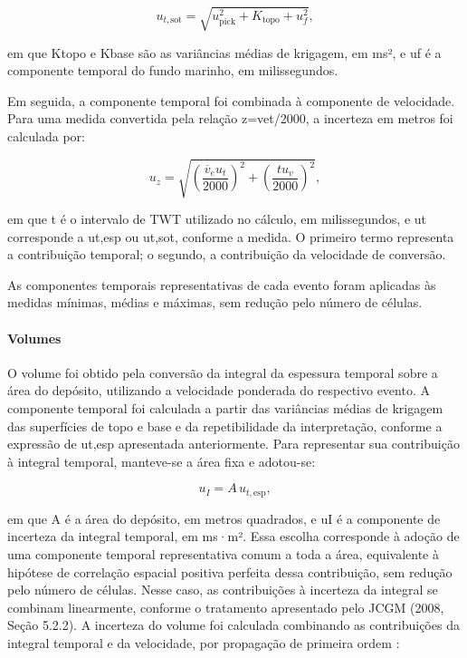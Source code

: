 \begin{equation}
  u_{t,\mathrm{sot}}=\sqrt{u_{\mathrm{pick}}^2+K_{\mathrm{topo}}+u_f^2},
  \label{eq:incerteza-temporal-soterramento}
\end{equation}

\noindent
em que Ktopo e Kbase são as variâncias médias de krigagem, em ms², e uf é a componente temporal do fundo marinho, em milissegundos.

Em seguida, a componente temporal foi combinada à componente de velocidade. Para uma medida convertida pela relação z=vet/2000, a incerteza em metros foi calculada por:

\begin{equation}
  u_z=\sqrt{\left(\frac{\overline{v}_e u_t}{2000}\right)^2+\left(\frac{t u_v}{2000}\right)^2},
  \label{eq:incerteza-profundidade}
\end{equation}

\noindent
em que t é o intervalo de TWT utilizado no cálculo, em milissegundos, e ut corresponde a ut,esp ou ut,sot, conforme a medida. O primeiro termo representa a contribuição temporal; o segundo, a contribuição da velocidade de conversão.

As componentes temporais representativas de cada evento foram aplicadas às medidas mínimas, médias e máximas, sem redução pelo número de células.

\paragraph{Volumes}

O volume foi obtido pela conversão da integral da espessura temporal sobre a área do depósito, utilizando a velocidade ponderada do respectivo evento. A componente temporal foi calculada a partir das variâncias médias de krigagem das superfícies de topo e base e da repetibilidade da interpretação, conforme a expressão de ut,esp apresentada anteriormente. Para representar sua contribuição à integral temporal, manteve-se a área fixa e adotou-se:

\begin{equation}
  u_I=A\,u_{t,\mathrm{esp}},
  \label{eq:incerteza-integral-temporal}
\end{equation}

\noindent
em que A é a área do depósito, em metros quadrados, e uI é a componente de incerteza da integral temporal, em ms·m². Essa escolha corresponde à adoção de uma componente temporal representativa comum a toda a área, equivalente à hipótese de correlação espacial positiva perfeita dessa contribuição, sem redução pelo número de células. Nesse caso, as contribuições à incerteza da integral se combinam linearmente, conforme o tratamento apresentado pelo JCGM (2008, Seção 5.2.2). A incerteza do volume foi calculada combinando as contribuições da integral temporal e da velocidade, por propagação de primeira ordem \cite{taylor1997}:


